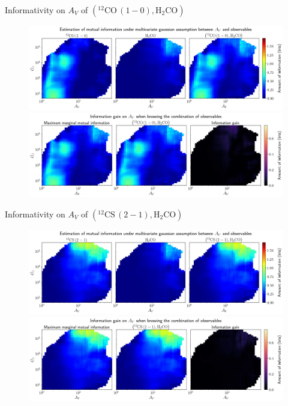\documentclass{beamer}
\begin{document}
\begin{frame}{Informativity on $A_V$ of $\left(\mathrm{^{12}CO\,(1-0)},\mathrm{H_2CO}\right)$}
    \begin{figure}
        \centering
        \includegraphics[width=0.95\linewidth]{../linearinfogauss/av__12co10_h2co_linearinfogauss.png}
        \vfill
        \includegraphics[width=0.95\linewidth]{../linearinfogauss/av__12co10_h2co_linearinfogauss_gain.png}
    \end{figure}
\end{frame}

\begin{frame}{Informativity on $A_V$ of $\left(\mathrm{^{12}CS\,(2-1)},\mathrm{H_2CO}\right)$}
    \begin{figure}
        \centering
        \includegraphics[width=0.95\linewidth]{../linearinfogauss/av__12cs21_h2co_linearinfogauss.png}
        \vfill
        \includegraphics[width=0.95\linewidth]{../linearinfogauss/av__12cs21_h2co_linearinfogauss_gain.png}
    \end{figure}
\end{frame}
\end{document}
